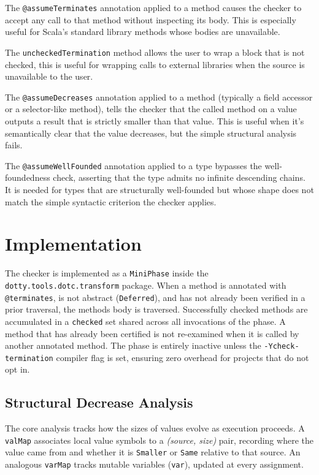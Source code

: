 The \texttt{@assumeTerminates} annotation applied to a method causes the checker
to accept any call to that method without inspecting its body. This is
especially useful for Scala's standard library methods whose bodies are
unavailable.

The \texttt{uncheckedTermination} method allows the user to wrap a block that is
not checked, this is useful for wrapping calls to external libraries when the
source is unavailable to the user.

The \texttt{@assumeDecreases} annotation applied to a method (typically a field
accessor or a selector-like method), tells the checker that the called method on
a value outputs a result that is strictly smaller than that value.
This is useful when it's semantically clear that the value decreases, but the
simple structural analysis fails.

The \texttt{@assumeWellFounded} annotation applied to a type bypasses the
well-foundedness check, asserting that the type admits no infinite descending
chains. It is needed for types that are structurally well-founded but whose
shape does not match the simple syntactic criterion the checker applies.


\chapter{Implementation}

The checker is implemented as a \texttt{MiniPhase} inside the
\texttt{dotty.tools.dotc.transform} package.
When a method is annotated with \texttt{@terminates}, is not abstract
(\texttt{Deferred}), and has not already been verified in a prior traversal, the
methods body is traversed. Successfully checked methods are accumulated in a
\texttt{checked} set shared across all invocations of the phase. A method that
has already been certified is not re-examined when it is called by another
annotated method. The phase is entirely inactive unless the
\texttt{-Ycheck-termination} compiler flag is set, ensuring zero overhead for
projects that do not opt in.

\section{Structural Decrease Analysis}
The core analysis tracks how the sizes of values evolve as execution proceeds.
A \texttt{valMap} associates local value symbols to a \emph{(source, size)}
pair, recording where the value came from and whether it is \texttt{Smaller}
or \texttt{Same} relative to that source. An analogous \texttt{varMap} tracks
mutable variables (\texttt{var}), updated at every assignment.


